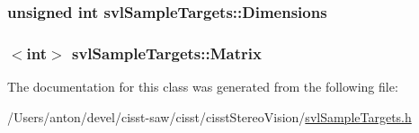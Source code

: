 \subsubsection[{Dimensions}]{\setlength{\rightskip}{0pt plus 5cm}unsigned int svl\+Sample\+Targets\+::\+Dimensions\hspace{0.3cm}{\ttfamily [protected]}}\label{classsvl_sample_targets_aefc5e0137cd9dfee5611532f336610bf}
\hypertarget{classsvl_sample_targets_ae0bfb3f3979168e88f318894f4439764}{}
\subsubsection[{Matrix}]{$<$int$>$ svl\+Sample\+Targets\+::\+Matrix\hspace{0.3cm}{\ttfamily [protected]}}\label{classsvl_sample_targets_ae0bfb3f3979168e88f318894f4439764}


The documentation for this class was generated from the following file\+:\begin{DoxyCompactItemize}
\item 
/\+Users/anton/devel/cisst-\/saw/cisst/cisst\+Stereo\+Vision/\hyperlink{svl_sample_targets_8h}{svl\+Sample\+Targets.\+h}\end{DoxyCompactItemize}
